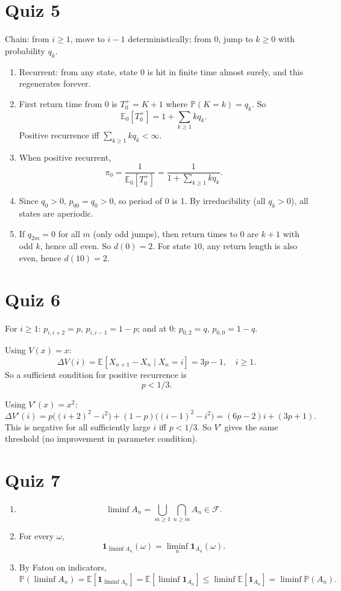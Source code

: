 \documentclass[11pt]{article}
\newcommand{\PP}{\mathbb{P}}
\newcommand{\EE}{\mathbb{E}}
\newcommand{\1}{\mathbf{1}}
\begin{document}
\section{Quiz 5}

Chain: from $i\ge1$, move to $i-1$ deterministically; from $0$, jump to $k\ge0$ with probability $q_k$.
\begin{enumerate}
\item Recurrent: from any state, state $0$ is hit in finite time almost surely, and this regenerates forever.
\item First return time from 0 is $T_0^+=K+1$ where $\PP(K=k)=q_k$. So
\[
\EE_0[T_0^+]=1+\sum_{k\ge1}kq_k.
\]
Positive recurrence iff $\sum_{k\ge1}kq_k<\infty$.
\item When positive recurrent,
\[
\pi_0=\frac1{\EE_0[T_0^+]}=\frac1{1+\sum_{k\ge1}kq_k}.
\]
\item Since $q_0>0$, $p_{00}=q_0>0$, so period of $0$ is 1. By irreducibility (all $q_k>0$), all states are aperiodic.
\item If $q_{2m}=0$ for all $m$ (only odd jumps), then return times to $0$ are $k+1$ with odd $k$, hence all even. So $d(0)=2$.
For state $10$, any return length is also even, hence $d(10)=2$.
\end{enumerate}

\section{Quiz 6}

For $i\ge1$: $p_{i,i+2}=p$, $p_{i,i-1}=1-p$; and at 0: $p_{0,2}=q$, $p_{0,0}=1-q$.

Using $V(x)=x$:
\[
\Delta V(i)=\EE[X_{n+1}-X_n\mid X_n=i]=3p-1,\quad i\ge1.
\]
So a sufficient condition for positive recurrence is
\[
p<1/3.
\]

Using $V'(x)=x^2$:
\[
\Delta V'(i)=p\big((i+2)^2-i^2\big)+(1-p)\big((i-1)^2-i^2\big)
=(6p-2)i+(3p+1).
\]
This is negative for all sufficiently large $i$ iff $p<1/3$. So $V'$ gives the same threshold (no improvement in parameter condition).

\section{Quiz 7}

\begin{enumerate}
\item
\[
\liminf A_n=\bigcup_{m\ge1}\bigcap_{n\ge m}A_n\in\mathcal F.
\]
\item For every $\omega$,
\[
\1_{\liminf A_n}(\omega)=\liminf_n\1_{A_n}(\omega).
\]
\item By Fatou on indicators,
\[
\PP(\liminf A_n)=\EE[\1_{\liminf A_n}]
=\EE[\liminf\1_{A_n}]
\le\liminf\EE[\1_{A_n}]
=\liminf\PP(A_n).
\]
\end{enumerate}
\end{document}
